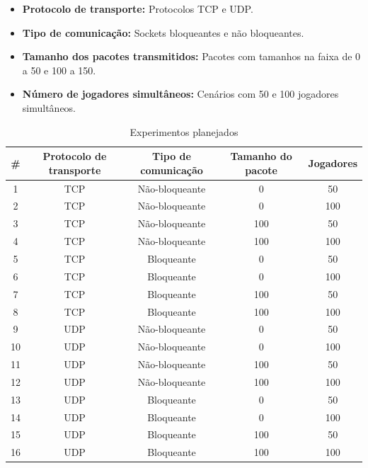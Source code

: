 \documentclass[12pt]{article}
\begin{document}
\begin{itemize}
  \item \textbf{Protocolo de transporte:} Protocolos TCP e UDP.
  \item \textbf{Tipo de comunicação:} Sockets bloqueantes e não bloqueantes.
  \item \textbf{Tamanho dos pacotes transmitidos:} Pacotes com tamanhos na faixa de 0 a 50 e 100 a 150.
  \item \textbf{Número de jogadores simultâneos:} Cenários com 50 e 100 jogadores simultâneos.
\end{itemize}

\begin{table}
  \center
  \footnotesize
  \begin{tabular}{|c|c|c|c|c|}
  \hline
    \#  & \textbf{Protocolo de transporte} & \textbf{Tipo de comunicação} & \textbf{Tamanho do pacote} & \textbf{Jogadores} \\ \hline
    1 & TCP & Não-bloqueante & 0 & 50 \\ \hline
    2 & TCP & Não-bloqueante & 0 & 100 \\ \hline
    3 & TCP & Não-bloqueante & 100 & 50 \\ \hline
    4 & TCP & Não-bloqueante & 100 & 100 \\ \hline
    5 & TCP & Bloqueante & 0 & 50 \\ \hline
    6 & TCP & Bloqueante & 0 & 100 \\ \hline
    7 & TCP & Bloqueante & 100 & 50 \\ \hline
    8 & TCP & Bloqueante & 100 & 100 \\ \hline
    9 & UDP & Não-bloqueante & 0 & 50 \\ \hline
    10 & UDP & Não-bloqueante & 0 & 100 \\ \hline
    11 & UDP & Não-bloqueante & 100 & 50 \\ \hline
    12 & UDP & Não-bloqueante & 100 & 100 \\ \hline
    13 & UDP & Bloqueante & 0 & 50 \\ \hline
    14 & UDP & Bloqueante & 0 & 100 \\ \hline
    15 & UDP & Bloqueante & 100 & 50 \\ \hline
    16 & UDP & Bloqueante & 100 & 100 \\ \hline
  \end{tabular} 
\caption{Experimentos planejados}
\label{tab:experimentos}
\end{table} 
\end{document}
